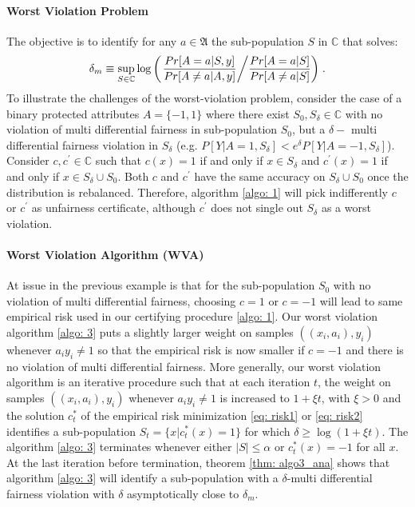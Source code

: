 \documentclass{article}
\begin{document}
\paragraph{Worst Violation Problem}
The objective is to identify for any $a\in \mathfrak{A}$ the sub-population $S$ in $\mathbb{C}$ that solves:
\begin{equation}
\label{eq: wvio}
    \delta_{m} \equiv \sup_{S\in \mathbb{C}}\log\left(\left.\frac{Pr[A=a|S, y]}{Pr[A\neq a|A, y]}\middle/\frac{Pr[A=a|S]}{Pr[A\neq a|S]}\right)\right. .
\end{equation}
To illustrate the challenges of the worst-violation problem, consider the case of a binary protected attributes $A=\{-1, 1\}$ where there exist $S_{0}, S_{\delta}\in \mathbb{C}$  with no violation of multi differential fairness in sub-population $S_{0}$, but a $\delta-$ multi differential fairness violation in $S_{\delta}$ (e.g. $P[Y| A=1, S_{\delta}] < e^{\delta}P[Y| A=-1, S_{\delta}]$).  Consider $c, c^{'}\in \mathbb{C}$ such that $c(x)=1$ if and only if $x\in S_{\delta}$ and $c^{'}(x)=1$ if and only if $x\in S_{\delta}\cup S_{0}$. Both $c$ and $c^{'}$ have the same accuracy on $S_{\delta}\cup S_{0}$ once the distribution is rebalanced. Therefore, algorithm \ref{algo: 1} will pick indifferently $c$ or $c^{'}$ as unfairness certificate, although $c^{'}$ does not single out $S_{\delta}$ as a worst violation. 

\paragraph{Worst Violation Algorithm (WVA)}
At issue in the previous example is that for the sub-population $S_{0}$  with no violation of multi differential fairness, choosing $c=1$ or $c=-1$ will lead to same empirical risk used in our certifying procedure \ref{algo: 1}. Our worst violation algorithm \ref{algo: 3} puts a slightly larger weight on samples $((x_{i}, a_{i}), y_{i})$ whenever $a_{i}y_{i}\neq 1$ so that the empirical risk is now smaller if $c=-1$ and there is no violation of multi differential fairness.  More generally, our worst violation algorithm is an iterative procedure such that at each iteration $t$, the weight on samples $((x_{i}, a_{i}), y_{i})$ whenever $a_{i}y_{i}\neq 1$ is increased to $1 + \xi t$, with $\xi > 0$ and the solution $c_{t}^{*}$ of the empirical risk minimization \eqref{eq: risk1} or \eqref{eq: risk2} identifies a sub-population $S_{t}=\{x| c_{t}^{*}(x)=1\}$ for which $\delta \geq \log(1 + \xi t)$. The algorithm \ref{algo: 3} terminates whenever either $|S|\leq \alpha$ or $c^{*}_{t}(x)=-1$ for all $x$. At the last iteration before termination, theorem \ref{thm: algo3_ana} shows that algorithm \ref{algo: 3} will identify a sub-population with a $\delta$-multi differential fairness violation with $\delta$ asymptotically close to $\delta_{m}$. 
\end{document}
